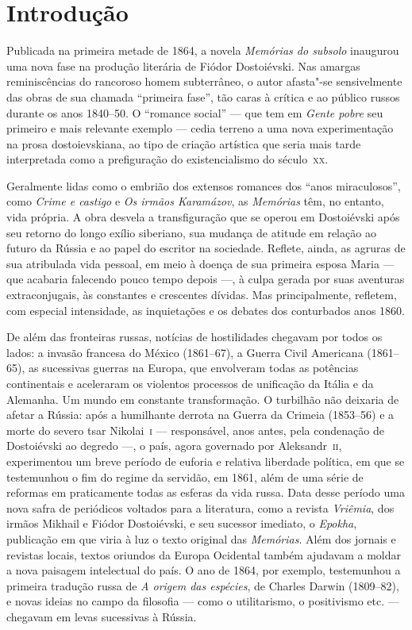 \pagestyle{plain}

\chapter[Introdução, por Lucas Simone]{Introdução}


Publicada na primeira metade de 1864, a novela \textit{Memórias do subsolo}
inaugurou uma nova fase na produção literária de Fiódor Dostoiévski. Nas
amargas reminiscências do rancoroso homem subterrâneo, o autor afasta"-se
sensivelmente das obras de sua chamada “primeira fase”, tão caras à crítica e
ao público russos durante os anos 1840--50. O “romance social” --- que tem em
\textit{Gente pobre} seu primeiro e mais relevante exemplo --- cedia terreno a
uma nova experimentação na prosa dostoievskiana, ao tipo de criação artística
que seria mais tarde interpretada como a prefiguração do existencialismo do
século~\textsc{xx}.

Geralmente lidas como o embrião dos extensos romances dos “anos miraculosos”,
como \textit{Crime e castigo} e \textit{Os irmãos Karamázov}, as
\textit{Memórias} têm, no entanto, vida própria. A obra desvela a
transfiguração que se operou em Dostoiévski após seu retorno do longo exílio
siberiano, sua mudança de atitude em relação ao futuro da Rússia e ao papel do
escritor na sociedade.  Reflete, ainda, as agruras de sua atribulada vida
pessoal, em meio à doença de sua primeira esposa Maria --- que acabaria falecendo
pouco tempo depois ---, à culpa gerada por suas aventuras extraconjugais, às
constantes e crescentes dívidas. Mas principalmente, refletem, com especial
intensidade, as inquietações e os debates dos conturbados anos 1860.


De além das fronteiras russas, notícias de hostilidades chegavam por todos os
lados: a invasão francesa do México (1861--67), a Guerra Civil Americana
(1861--65), as sucessivas guerras na Europa, que envolveram todas as potências
continentais e aceleraram os violentos processos de unificação da Itália e da
Alemanha. Um mundo em constante transformação. O turbilhão não deixaria de
afetar a Rússia: após a humilhante derrota na Guerra da Crimeia (1853--56) e a
morte do severo tsar Nikolai~\textsc{i} --- responsável, anos antes, pela condenação de
Dostoiévski ao degredo ---, o país, agora governado por Aleksandr~\textsc{ii},
experimentou um breve período de euforia e relativa liberdade política, em que
se testemunhou o fim do regime da servidão, em 1861, além de uma série de
reformas em praticamente todas as esferas da vida russa. Data desse período uma
nova safra de periódicos voltados para a literatura, como a revista
\textit{Vriêmia}, dos irmãos Mikhail e Fiódor Dostoiévski, e seu sucessor
imediato, o \textit{Epokha}, publicação em que viria à luz o texto original das
\textit{Memórias}. Além dos jornais e revistas locais, textos oriundos da
Europa Ocidental também ajudavam a moldar a nova paisagem intelectual do país.
O ano de 1864, por exemplo, testemunhou a primeira tradução russa de \textit{A
origem das espécies}, de Charles Darwin (1809--82), e novas ideias no campo da
filosofia --- como o utilitarismo, o positivismo etc. --- chegavam em levas sucessivas à Rússia.

